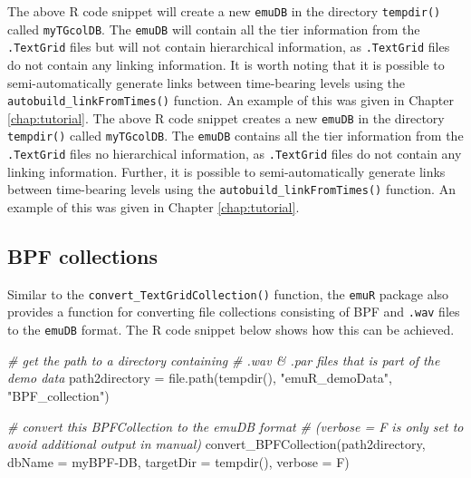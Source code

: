 \documentclass[
]{book}
\newenvironment{Shaded}{\begin{snugshade}}{\end{snugshade}}
\newcommand{\AttributeTok}[1]{\textcolor[rgb]{0.77,0.63,0.00}{#1}}
\newcommand{\CommentTok}[1]{\textcolor[rgb]{0.56,0.35,0.01}{\textit{#1}}}
\newcommand{\FunctionTok}[1]{\textcolor[rgb]{0.00,0.00,0.00}{#1}}
\newcommand{\NormalTok}[1]{#1}
\newcommand{\OtherTok}[1]{\textcolor[rgb]{0.56,0.35,0.01}{#1}}
\newcommand{\StringTok}[1]{\textcolor[rgb]{0.31,0.60,0.02}{#1}}
\begin{document}
The above R code snippet will create a new \texttt{emuDB} in the directory \texttt{tempdir()} called \texttt{myTGcolDB}. The \texttt{emuDB} will contain all the tier information from the \texttt{.TextGrid} files but will not contain hierarchical information, as \texttt{.TextGrid} files do not contain any linking information. It is worth noting that it is possible to semi-automatically generate links between time-bearing levels using the \texttt{autobuild\_linkFromTimes()} function. An example of this was given in Chapter \ref{chap:tutorial}.
The above R code snippet creates a new \texttt{emuDB} in the directory \texttt{tempdir()} called \texttt{myTGcolDB}. The \texttt{emuDB} contains all the tier information from the \texttt{.TextGrid} files no hierarchical information, as \texttt{.TextGrid} files do not contain any linking information. Further, it is possible to semi-automatically generate links between time-bearing levels using the \texttt{autobuild\_linkFromTimes()} function. An example of this was given in Chapter \ref{chap:tutorial}.

\hypertarget{bpf-collections}{%
\subsection{BPF collections}\label{bpf-collections}}

Similar to the \texttt{convert\_TextGridCollection()} function, the \texttt{emuR} package also provides a function for converting file collections consisting of BPF and \texttt{.wav} files to the \texttt{emuDB} format. The R code snippet below shows how this can be achieved.

\begin{Shaded}
\begin{Highlighting}[]
\CommentTok{\# get the path to a directory containing}
\CommentTok{\# .wav \& .par files that is part of the demo data}
\NormalTok{path2directory }\OtherTok{=} \FunctionTok{file.path}\NormalTok{(}\FunctionTok{tempdir}\NormalTok{(),}
                           \StringTok{"emuR\_demoData"}\NormalTok{,}
                           \StringTok{"BPF\_collection"}\NormalTok{)}

\CommentTok{\# convert this BPFCollection to the emuDB format}
\CommentTok{\# (verbose = F is only set to avoid additional output in manual)}
\FunctionTok{convert\_BPFCollection}\NormalTok{(path2directory, }
                      \AttributeTok{dbName =} \StringTok{\textquotesingle{}myBPF{-}DB\textquotesingle{}}\NormalTok{,}
                      \AttributeTok{targetDir =} \FunctionTok{tempdir}\NormalTok{(), }
                      \AttributeTok{verbose =}\NormalTok{ F)}
\end{Highlighting}
\end{Shaded}
\end{document}
